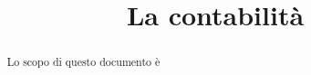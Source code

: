 \documentclass[a4paper,10pt]{article}
\title{La contabilit\`{a}}
\author{}
\begin{document}
\maketitle

\begin{abstract}
Lo scopo di questo documento \`{e}
\end{abstract}

\section{}
\end{document}
